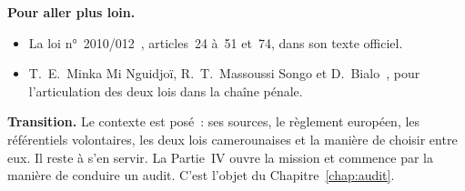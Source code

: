 \bigskip

\begin{boxinfo}
\textbf{Pour aller plus loin.}
\begin{itemize}
    \item La loi n°~2010/012~\cite{loi2010012}, articles~24 à~51 et~74, dans
          son texte officiel.
    \item T.~E.~Minka Mi Nguidjoï, R.~T.~Massoussi Songo et
          D.~Bialo~\cite{minka2026chainepenale}, pour l'articulation des
          deux lois dans la chaîne pénale.
\end{itemize}
\end{boxinfo}

\begin{boxinfo}
\textbf{Transition.} Le contexte est posé~: ses sources, le règlement
européen, les référentiels volontaires, les deux lois camerounaises et la
manière de choisir entre eux. Il reste à s'en servir. La Partie~IV ouvre la
mission et commence par la manière de conduire un audit. C'est l'objet du
Chapitre~\ref{chap:audit}.
\end{boxinfo}
